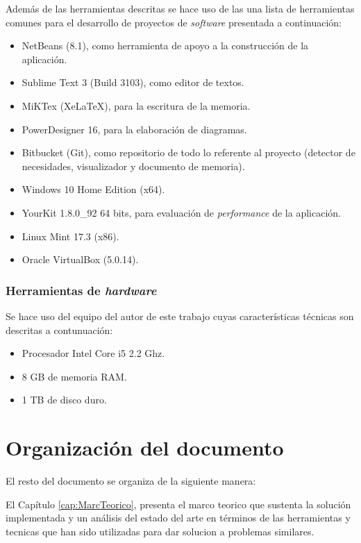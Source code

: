 Además de las herramientas descritas se hace uso de las una lista de herramientas comunes para el desarrollo de proyectos de \textit{software} presentada a continuación:

\begin{itemize}
\item NetBeans (8.1), como herramienta de apoyo a la construcción de la aplicación.
\item Sublime Text 3 (Build 3103), como editor de textos.
\item MiKTex (XeLaTeX), para la escritura de la memoria.
\item PowerDesigner 16, para la elaboración de diagramas.
\item Bitbucket (Git), como repositorio de todo lo referente al proyecto (detector de necesidades, visualizador y documento de memoria).
\item Windows 10 Home Edition (x64).
\item YourKit 1.8.0\_92 64 bits, para evaluación de \textit{performance} de la aplicación.
\item Linux Mint 17.3 (x86).
\item Oracle VirtualBox (5.0.14).
\end{itemize}

\subsubsection*{Herramientas de \textit{hardware}}
\label{subsubsec:HerrHardw}

Se hace uso del equipo del autor de este trabajo cuyas características técnicas son descritas a contunuación:
\begin{itemize}
\item Procesador Intel Core i5 2.2 Ghz.
\item 8 GB de memoria RAM.
\item 1 TB de disco duro.
\end{itemize}

\section{Organización del documento}
\label{intro:organizacion}

El resto del documento se organiza de la siguiente manera:

El Capítulo \ref{cap:MarcTeorico}, presenta el marco teorico que sustenta la solución implementada y un análisis del estado del arte en términos de las herramientas y tecnicas que han sido utilizadas para dar solucion a problemas similares.

